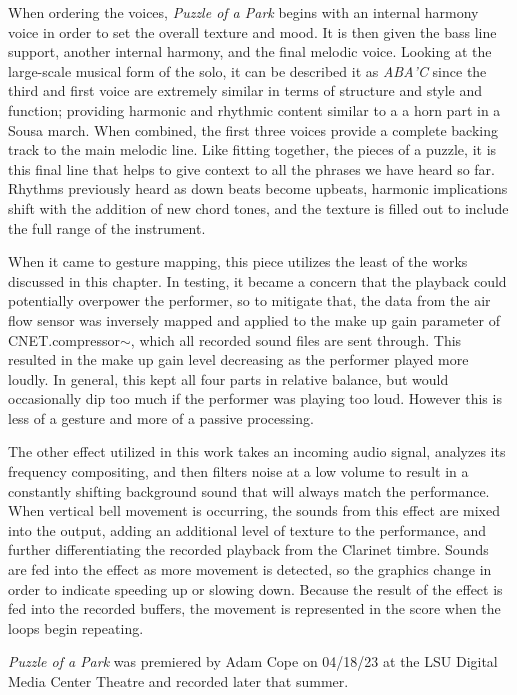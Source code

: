 When ordering the voices, \textit{Puzzle of a Park} begins with an internal harmony voice in order to set the overall texture and mood. It is then given the bass line support, another internal harmony, and the final melodic voice. Looking at the large-scale musical form of the solo, it can be described it as \emph{ABA'C} since the third and first voice are extremely similar in terms of structure and style and function; providing harmonic  and rhythmic content similar to a a horn part in a Sousa march. When combined, the first three voices provide a complete backing track to the main melodic line. Like fitting together, the pieces of a puzzle, it is this final line that helps to give context to all the phrases we have heard so far. Rhythms previously heard as down beats become upbeats, harmonic implications shift with the addition of new chord tones, and the texture is filled out to include the full range of the instrument.

When it came to gesture mapping, this piece utilizes the least of the works discussed in this chapter. In testing, it became a concern that the playback could potentially overpower the performer, so to mitigate that, the data from the air flow sensor was inversely mapped and applied to the make up gain parameter of CNET.compressor$\sim$, which all recorded sound files are sent through. This resulted in the make up gain level decreasing as the performer played more loudly. In general, this kept all four parts in relative balance, but would occasionally dip too much if the performer was playing too loud. However this is less of a gesture and more of a passive processing.

The other effect utilized in this work takes an incoming audio signal, analyzes its frequency compositing, and then filters noise at a low volume to result in a constantly shifting background sound that will always match the performance. When vertical bell movement is occurring, the sounds from this effect are mixed into the output, adding an additional level of texture to the performance, and further differentiating the recorded playback from the Clarinet timbre. Sounds are fed into the effect as more movement is detected, so the graphics change in order to indicate speeding up or slowing down. Because the result of the effect is fed into the recorded buffers, the movement is represented in the score when the loops begin repeating.

\textit{Puzzle of a Park} was premiered by Adam Cope on 04/18/23 at the LSU Digital Media Center Theatre and recorded later that summer.

